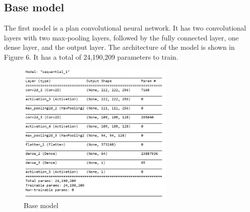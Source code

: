 \documentclass{article}
\begin{document}
\subsection{Base model}
The first model is a plan convolutional neural network. It has two convolutional layers with two max-pooling layers, followed by the fully connected layer, one dense layer, and the output layer. The architecture of the model is shown in Figure 6. It has a total of 24,190,209 parameters to train.
\begin{figure}[H]
 \centering
    \includegraphics[width=3.0in]{figs/Model}
    \caption{Base model}
\end{figure} 
\end{document}
